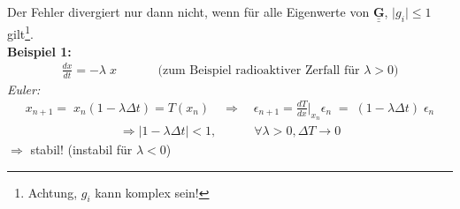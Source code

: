 \documentclass[12pt]{article}
\begin{document}
Der Fehler divergiert nur dann nicht, wenn für alle Eigenwerte von $\underline{ \underline{\mathbf{G} }}$, $\vert g_i \vert \leq 1$ gilt\footnote{Achtung, $g_i$ kann komplex sein!}.
\\
\textbf{Beispiel 1: }
\begin{align*}
\frac{dx}{dt}= - \lambda \; x \quad \quad \quad \text{  (zum Beispiel radioaktiver Zerfall für } \lambda > 0)
 \end{align*}
 \textit{Euler:}
 \begin{align*}
 x_{n+1} = \;  x_n ( 1- \lambda \Delta t) = T (x_n) \quad
 \Rightarrow \quad \epsilon_{n+1} = \frac{dT}{dx} \biggr\vert _{x_n} \epsilon_n \; =\;  (1- \lambda \Delta t) \; \epsilon_n 
 \end{align*}
 \begin{align}
   \Rightarrow  \vert 1 - \lambda \Delta t \vert <1 , \quad \quad \quad \forall \lambda > 0, \Delta T \to 0
 \end{align}
$\Rightarrow$ stabil! (instabil für $\lambda < 0$) \\
\end{document}
